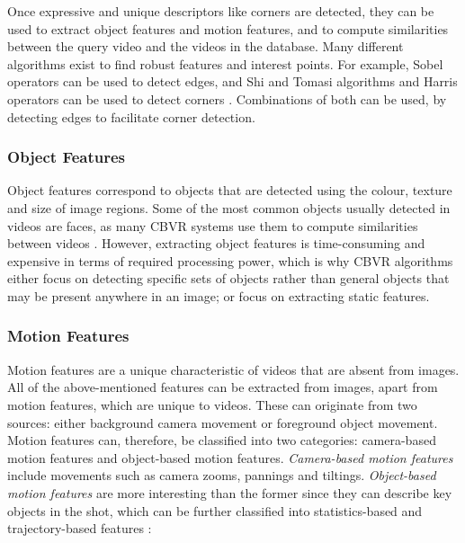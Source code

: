Once expressive and unique descriptors like corners are detected, they can be used to extract object features and motion features, and to compute similarities between the query video and the videos in the database. Many different algorithms exist to find robust features and interest points. For example, Sobel operators can be used to detect edges, and Shi and Tomasi algorithms and Harris operators can be used to detect corners \cite{bradski2008opencv}. Combinations of both can be used, by detecting edges to facilitate corner detection.

\subsubsection{Object Features}

Object features correspond to objects that are detected using the colour, texture and size of image regions. Some of the most common objects usually detected in videos are faces, as many CBVR systems use them to compute similarities between videos \cite{sivic2005face}. However, extracting object features is time-consuming and expensive in terms of required processing power, which is why CBVR algorithms either focus on detecting specific sets of objects rather than general objects that may be present anywhere in an image; or focus on extracting static features.

\subsubsection{Motion Features}

Motion features are a unique characteristic of videos that are absent from images. All of the above-mentioned features can be extracted from images, apart from motion features, which are unique to videos. These can originate from two sources: either background camera movement or foreground object movement. Motion features can, therefore, be classified into two categories: camera-based motion features and object-based motion features. \textit{Camera-based motion features} include movements such as camera zooms, pannings and tiltings. \textit{Object-based motion features} are more interesting than the former since they can describe key objects in the shot, which can be further classified into statistics-based and trajectory-based features \cite{hu2011survey}:
    
